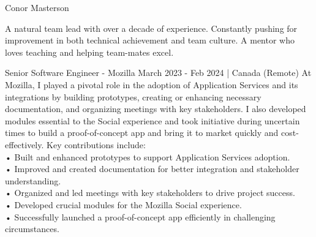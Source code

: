 \documentclass[
	10pt, %
]{FreemanCV}
\begin{document}
	
{\sffamily\Huge\noindent Conor Masterson} %
	
\medskip %
	
{\sffamily\large\noindent A natural team lead with over a decade of experience. Constantly pushing for improvement in both technical achievement and team culture. A mentor who loves teaching and helping team-mates excel.}
\medskip

\begin{paracol}{2} %


\jobentry
	{Senior Software Engineer - Mozilla}
    {March 2023 - Feb 2024 | Canada (Remote)}
    {At Mozilla, I played a pivotal role in the adoption of Application Services and its integrations by building prototypes, creating or enhancing necessary documentation, and organizing meetings with key stakeholders. I also developed modules essential to the Social experience and took initiative during uncertain times to build a proof-of-concept app and bring it to market quickly and cost-effectively. Key contributions include:\medskip\\
    • Built and enhanced prototypes to support Application Services adoption.\\
    • Improved and created documentation for better integration and stakeholder understanding.\\
    • Organized and led meetings with key stakeholders to drive project success.\\
    • Developed crucial modules for the Mozilla Social experience.\\
    • Successfully launched a proof-of-concept app efficiently in challenging circumstances.}


\end{paracol}
\end{document}

